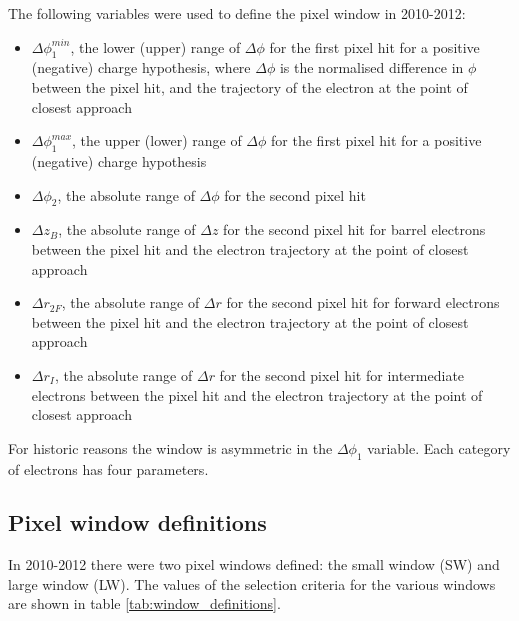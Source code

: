 The following variables were used to define the pixel window in 2010-2012:
\begin{itemize}
  \item $\Delta\phi_1^{min}$, the lower (upper) range of $\Delta\phi$ for the first pixel hit for a positive (negative) charge hypothesis, where $\Delta\phi$ is the normalised difference in $\phi$ between the pixel hit, and the trajectory of the electron at the point of closest approach
  \item $\Delta\phi_1^{max}$, the upper (lower) range of $\Delta\phi$ for the first pixel hit for a positive (negative) charge hypothesis
  \item $\Delta\phi_2$, the absolute range of $\Delta\phi$ for the second pixel hit
  \item $\Delta z_B$, the absolute range of $\Delta z$ for the second pixel hit for barrel electrons between the pixel hit and the electron trajectory at the point of closest approach
  \item $\Delta r_{2F}$, the absolute range of $\Delta r$ for the second pixel hit for forward electrons between the pixel hit and the electron trajectory at the point of closest approach
  \item $\Delta r_I$, the absolute range of $\Delta r$ for the second pixel hit for intermediate electrons between the pixel hit and the electron trajectory at the point of closest approach
\end{itemize}

For historic reasons the window is asymmetric in the $\Delta\phi_1$ variable.  Each category of electrons has four parameters.

\subsection{Pixel window definitions}

In 2010-2012 there were two pixel windows defined: the small window (SW) and large window (LW).  The values of the selection criteria for the various windows are shown in table \ref{tab:window_definitions}.


